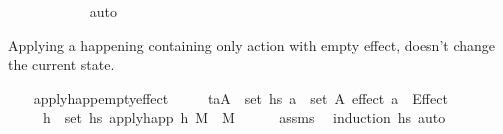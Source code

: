 \begin{isabellebody}
\ \ \ \ \ \ \ \ \ \ \isamarkupfalse%
\ auto\isanewline
\ \ \ \ \ \ \isamarkupfalse%
\isanewline
\ \ \ \ \isamarkupfalse%
%
\endisatagproof
{\isafoldproof}%
%
\isadelimproof
%
\endisadelimproof
%
\begin{isamarkuptext}%
Applying a happening containing only action with empty effect, doesn't 
  change the current state.%
\end{isamarkuptext}\isamarkuptrue%
\ \ \isamarkupfalse%
\ apply{\isacharunderscore}{\kern0pt}happ{\isacharunderscore}{\kern0pt}empty{\isacharunderscore}{\kern0pt}effect{\isacharcolon}{\kern0pt}\isanewline
\ \ \ \ \ {\isachardoublequoteopen}{\isasymforall}{\isacharparenleft}{\kern0pt}t\isactrlsub a{\isacharcomma}{\kern0pt}A{\isacharparenright}{\kern0pt}\ {\isasymin}\ set\ hs{\isachardot}{\kern0pt}\ {\isasymforall}a\ {\isasymin}\ set\ A{\isachardot}{\kern0pt}\ effect\ a\ {\isacharequal}{\kern0pt}\ Effect\ {\isacharbrackleft}{\kern0pt}{\isacharbrackright}{\kern0pt}\ {\isacharbrackleft}{\kern0pt}{\isacharbrackright}{\kern0pt}{\isachardoublequoteclose}\isanewline
\ \ \ \ \ {\isachardoublequoteopen}{\isasymforall}h\ {\isasymin}\ set\ hs{\isachardot}{\kern0pt}\ apply{\isacharunderscore}{\kern0pt}happ\ h\ M\ {\isacharequal}{\kern0pt}\ M{\isachardoublequoteclose}\isanewline
%
\isadelimproof
\ \ \ \ %
\endisadelimproof
%
\isatagproof
{}\isamarkupfalse%
\ assms\ \isamarkupfalse%
\ {\isacharparenleft}{\kern0pt}induction\ hs{\isacharparenright}{\kern0pt}\ auto%
\endisatagproof
{\isafoldproof}%
%
\isadelimproof
%
\endisadelimproof
%
\begin{isamarkuptext}%

\end{isamarkuptext}
\end{isabellebody}
